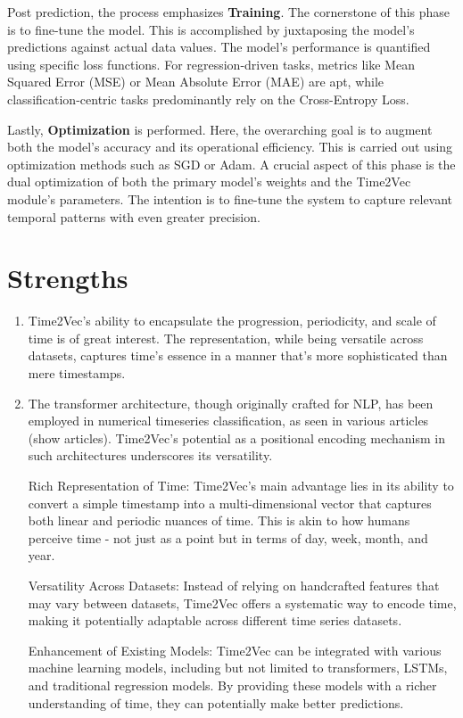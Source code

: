 \documentclass{tufte-handout}
\begin{document}
Post prediction, the process emphasizes \textbf{Training}. The cornerstone of this phase is to fine-tune the model. This is accomplished by juxtaposing the model's predictions against actual data values. The model's performance is quantified using specific loss functions. For regression-driven tasks, metrics like Mean Squared Error (MSE) or Mean Absolute Error (MAE) are apt, while classification-centric tasks predominantly rely on the Cross-Entropy Loss.

Lastly, \textbf{Optimization} is performed. Here, the overarching goal is to augment both the model's accuracy and its operational efficiency. This is carried out using optimization methods such as SGD or Adam. A crucial aspect of this phase is the dual optimization of both the primary model's weights and the Time2Vec module's parameters. The intention is to fine-tune the system to capture relevant temporal patterns with even greater precision.

\section{Strengths}

\begin{enumerate}
\item Time2Vec's ability to encapsulate the progression, periodicity, and scale of time is of great interest. The representation, while being versatile across datasets, captures time's essence in a manner that's more sophisticated than mere timestamps.

\item The transformer architecture, though originally crafted for NLP, has been employed in numerical timeseries classification, as seen in various articles (show articles). Time2Vec's potential as a positional encoding mechanism in such architectures underscores its versatility.

    Rich Representation of Time: Time2Vec's main advantage lies in its ability to convert a simple timestamp into a multi-dimensional vector that captures both linear and periodic nuances of time. This is akin to how humans perceive time - not just as a point but in terms of day, week, month, and year.

    Versatility Across Datasets: Instead of relying on handcrafted features that may vary between datasets, Time2Vec offers a systematic way to encode time, making it potentially adaptable across different time series datasets.

    Enhancement of Existing Models: Time2Vec can be integrated with various machine learning models, including but not limited to transformers, LSTMs, and traditional regression models. By providing these models with a richer understanding of time, they can potentially make better predictions.
\end{enumerate}
\end{document}
